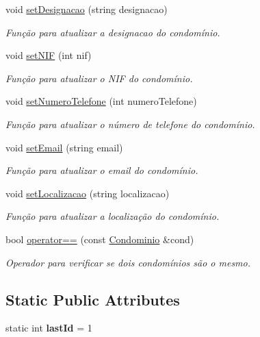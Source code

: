 \begin{DoxyCompactItemize}
void \hyperlink{class_condominio_a54e452fd5905ec95a028cd2dfefbc437}{set\+Designacao} (string designacao)
\begin{DoxyCompactList}\small\item\em Função para atualizar a designacao do condomínio. \end{DoxyCompactList}\item 
void \hyperlink{class_condominio_a89d828306fcbcc0df34d52e07b7e9bb7}{set\+N\+IF} (int nif)
\begin{DoxyCompactList}\small\item\em Função para atualizar o N\+IF do condomínio. \end{DoxyCompactList}\item 
void \hyperlink{class_condominio_a7f454a535fe1ebc3ab244415d963b719}{set\+Numero\+Telefone} (int numero\+Telefone)
\begin{DoxyCompactList}\small\item\em Função para atualizar o número de telefone do condomínio. \end{DoxyCompactList}\item 
void \hyperlink{class_condominio_ae0521eb8186f3c4000cc8c0fa6d4b762}{set\+Email} (string email)
\begin{DoxyCompactList}\small\item\em Função para atualizar o email do condomínio. \end{DoxyCompactList}\item 
void \hyperlink{class_condominio_ae87fcb0812e926dbdf6609f3359b9df9}{set\+Localizacao} (string localizacao)
\begin{DoxyCompactList}\small\item\em Função para atualizar a localização do condomínio. \end{DoxyCompactList}\item 
bool \hyperlink{class_condominio_a6726cb42e54e4084b0824ea1c2bd9172}{operator==} (const \hyperlink{class_condominio}{Condominio} \&cond)
\begin{DoxyCompactList}\small\item\em Operador para verificar se dois condomínios são o mesmo. \end{DoxyCompactList}\end{DoxyCompactItemize}
\subsection*{Static Public Attributes}
\begin{DoxyCompactItemize}
\item 
static int {\bfseries last\+Id} = 1\hypertarget{class_condominio_ad6d8cc37886212f5dbf8260c25a94961}{}\label{class_condominio_ad6d8cc37886212f5dbf8260c25a94961}

\end{DoxyCompactItemize}



